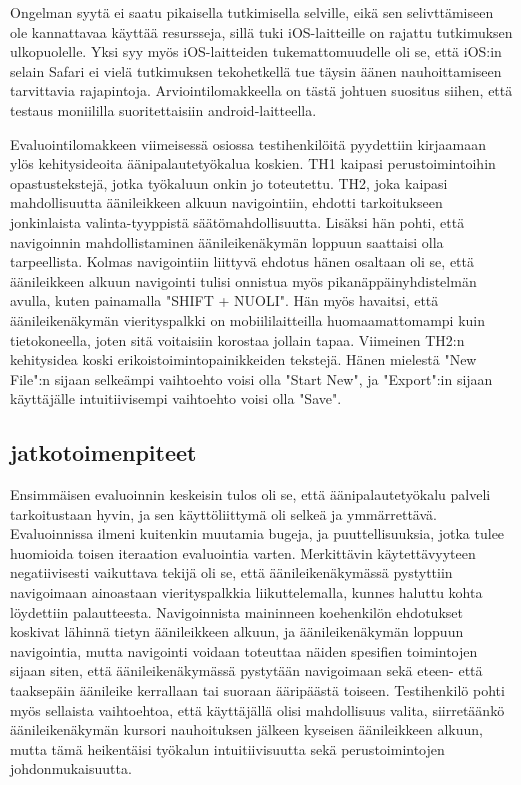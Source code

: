 \documentclass[utf8]{gradu3}
\begin{document}
Ongelman syytä ei saatu pikaisella tutkimisella selville, eikä sen selivttämiseen ole kannattavaa käyttää resursseja, sillä tuki iOS-laitteille on rajattu tutkimuksen ulkopuolelle. Yksi syy myös iOS-laitteiden tukemattomuudelle oli se, että iOS:in selain Safari ei vielä tutkimuksen tekohetkellä tue täysin äänen nauhoittamiseen tarvittavia rajapintoja. Arviointilomakkeella on tästä johtuen suositus siihen, että testaus moniililla suoritettaisiin android-laitteella. 

Evaluointilomakkeen viimeisessä osiossa testihenkilöitä pyydettiin kirjaamaan ylös kehitysideoita äänipalautetyökalua koskien. TH1 kaipasi perustoimintoihin opastustekstejä, jotka työkaluun onkin jo toteutettu. TH2, joka kaipasi mahdollisuutta äänileikkeen alkuun navigointiin, ehdotti tarkoitukseen jonkinlaista valinta-tyyppistä säätömahdollisuutta. Lisäksi hän pohti, että navigoinnin mahdollistaminen äänileikenäkymän loppuun saattaisi olla tarpeellista. Kolmas navigointiin liittyvä ehdotus hänen osaltaan oli se, että äänileikkeen alkuun navigointi tulisi onnistua myös pikanäppäinyhdistelmän avulla, kuten painamalla "SHIFT + NUOLI". Hän myös havaitsi, että äänileikenäkymän vierityspalkki on mobiililaitteilla huomaamattomampi kuin tietokoneella, joten sitä voitaisiin korostaa jollain tapaa. Viimeinen TH2:n kehitysidea koski erikoistoimintopainikkeiden tekstejä. Hänen mielestä "New File":n sijaan selkeämpi vaihtoehto voisi olla "Start New", ja "Export":in sijaan käyttäjälle intuitiivisempi vaihtoehto voisi olla "Save". 

\subsection{jatkotoimenpiteet}

Ensimmäisen evaluoinnin keskeisin tulos oli se, että äänipalautetyökalu palveli tarkoitustaan hyvin, ja sen käyttöliittymä oli selkeä ja ymmärrettävä. Evaluoinnissa ilmeni kuitenkin muutamia bugeja, ja puuttellisuuksia, jotka tulee huomioida toisen iteraation evaluointia varten. Merkittävin käytettävyyteen negatiivisesti vaikuttava tekijä oli se, että äänileikenäkymässä pystyttiin navigoimaan ainoastaan vierityspalkkia liikuttelemalla, kunnes haluttu kohta löydettiin palautteesta. Navigoinnista maininneen koehenkilön ehdotukset koskivat lähinnä tietyn äänileikkeen alkuun, ja äänileikenäkymän loppuun navigointia, mutta navigointi voidaan toteuttaa näiden spesifien toimintojen sijaan siten, että äänileikenäkymässä pystytään navigoimaan sekä eteen- että taaksepäin äänileike kerrallaan tai suoraan ääripäästä toiseen. Testihenkilö pohti myös sellaista vaihtoehtoa, että käyttäjällä olisi mahdollisuus valita, siirretäänkö äänileikenäkymän kursori nauhoituksen jälkeen kyseisen äänileikkeen alkuun, mutta tämä heikentäisi työkalun intuitiivisuutta sekä perustoimintojen johdonmukaisuutta.
\end{document}
